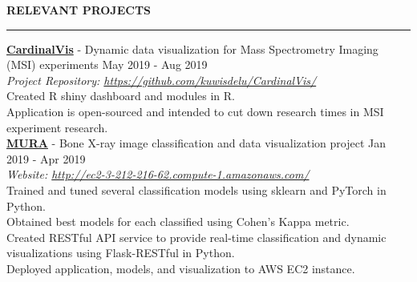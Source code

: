 \documentclass[a4paper]{article}
\newcommand{\myline}{\par
  \kern2pt %
  \hrule height 0.5pt
  \kern2pt %
}
\newcommand{\mybullet}{
	\indent 
  \textbullet \hspace*{2mm}
}
\begin{document}
\noindent
{\large \textbf{RELEVANT PROJECTS}}
\myline 
\smallskip

      \noindent
      \textbf{\href{https://github.com/kuwisdelu/CardinalVis/}{CardinalVis}} - 
      Dynamic data visualization for Mass Spectrometry Imaging (MSI) experiments 
      \hfill May 2019 - Aug 2019 \\
      \hfill \textit{Project Repository: \href{https://github.com/kuwisdelu/CardinalVis/}{https://github.com/kuwisdelu/CardinalVis/}}\\
      \mybullet Created R shiny dashboard and modules in R. \\
      \mybullet Application is open-sourced and intended to cut down research times in MSI experiment research. \\

      \noindent
      \textbf{\href{http://ec2-3-212-216-62.compute-1.amazonaws.com/}{MURA}} - Bone X-ray image 
      classification and data visualization project \hfill Jan 2019 - Apr 2019 \\
      \hfill \textit{Website: \href{http://ec2-3-212-216-62.compute-1.amazonaws.com/}{http://ec2-3-212-216-62.compute-1.amazonaws.com/}}\\
      \mybullet Trained and tuned several classification models using sklearn and PyTorch in Python. \\
      \mybullet Obtained best models for each classified using Cohen's Kappa metric. \\
      \mybullet Created RESTful API service to provide real-time classification and dynamic visualizations
      using Flask-RESTful in Python. \\
      \mybullet Deployed application, models, and visualization to AWS EC2 instance. \\
\end{document}
